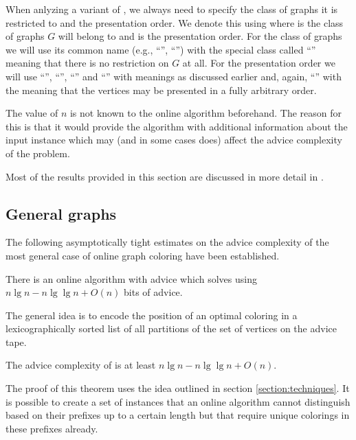 When anlyzing a variant of , we always need to
specify the class of graphs it is restricted to and the presentation
order. We denote this using  where  is the class
of graphs $G$ will belong to and  is the presentation order.
For the class of graphs we will use its common name (e.g.,
``'', ``'') with the special class
called ``'' meaning that there is no restriction on $G$ at
all. For the presentation order we will use ``'',
``'', ``'' and ``'' with
meanings as discussed earlier and, again, ``'' with the
meaning that the vertices may be presented in a fully arbitrary order.

The value of $n$ is not known to the online algorithm beforehand. The
reason for this is that it would provide the algorithm with additional
information about the input instance which may (and in some cases does)
affect the advice complexity of the problem.

Most of the results provided in this section are discussed in more detail
in \cite{misof-trivial-graphs}.


\subsection{General graphs}

The following asymptotically tight estimates on the advice complexity of
the most general case of online graph coloring have been established.

\begin{theorem}\label{theorem:general-graphs-upper}
    There is an online algorithm with advice which solves
     using $n \lg n - n \lg\lg n + O(n)$ bits of
    advice.
\end{theorem}

The general idea is to encode the position of an optimal coloring in a
lexicographically sorted list of all partitions of the set of vertices on
the advice tape.

\begin{theorem}\label{theorem:general-graphs-lower}
    The advice complexity of  is at least $n \lg n - n
    \lg\lg n + O(n)$.
\end{theorem}

The proof of this theorem uses the idea outlined in section
\ref{section:techniques}. It is possible to create a set of instances that
an online algorithm cannot distinguish based on their prefixes up to a
certain length but that require unique colorings in these prefixes
already.

